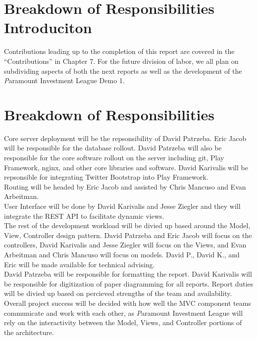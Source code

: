 \newpage
\section{Breakdown of Responsibilities Introduciton}

Contributions leading up to the completion of this report are covered in the
``Contributions'' in Chapter 7. For the future division of labor, we all plan
on subdividing aspects of both the next reports as well as the development of
the {\textit Paramount Investment League} Demo 1.

\section{Breakdown of Responsibilities}

Core server deployment will be the repsonsibility of David Patrzeba.  Eric Jacob will
be responsible for the database rollout.  David Patrzeba will also be responsible for
the core software rollout on the server including git, Play Framework, nginx, and other
core libraries and software.  David Karivalis will be repsonsible for integrating
Twitter Bootstrap into Play Framework.\\

Routing will be headed by Eric Jacob and assisted by Chris Mancuso and Evan Arbeitman.\\

User Interface will be done by David Karivalis and Jesse Ziegler and they will integrate
the REST API\cite{wiki:restful} to facilitate dynamic views.\\

The rest of the development workload will be divied up based around the Model, View,
Controller design pattern.  David Patrzeba and Eric Jacob will focus on the controllers,
David Karivalis and Jesse Ziegler will focus on the Views, and Evan Arbeitman and Chris
Mancuso will focus on models.  David P., David K., and Eric will be made available
for technical advising.\\

David Patrzeba will be responsible for formatting the report. David Karivalis will be
responsible for digitization of paper diagramming for all reports.  Report duties will
be divied up based on percieved strengths of the team and availability.\\

Overall project success will be decided with how well the MVC component teams communicate
and work with each other, as {\textit Paramount Investment League} will rely on the
interactivity between the Model, Views, and Controller portions of the architecture.\\

